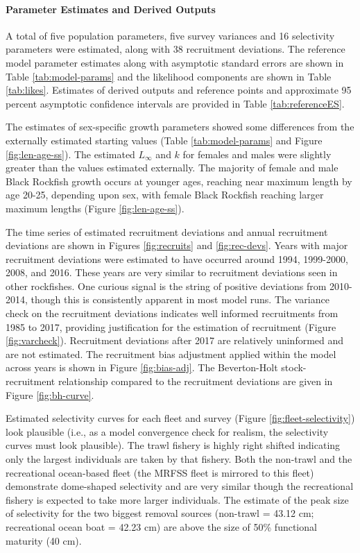 \documentclass[11pt,
  english,
  letterpaper,
]{article}
\begin{document}
\hypertarget{parameter-estimates-and-derived-outputs}{%
\paragraph{Parameter Estimates and Derived Outputs}\label{parameter-estimates-and-derived-outputs}}

A total of five population parameters, five survey variances and 16 selectivity parameters were estimated, along with 38 recruitment deviations. The reference model parameter estimates along with asymptotic standard errors are shown in Table \ref{tab:model-params} and the likelihood components are shown in Table \ref{tab:likes}. Estimates of derived outputs and reference points and approximate 95 percent asymptotic confidence intervals are provided in Table \ref{tab:referenceES}.

The estimates of sex-specific growth parameters showed some differences from the externally estimated starting values (Table \ref{tab:model-params} and Figure \ref{fig:len-age-ss}). The estimated \(L_{\infty}\) and \(k\) for females and males were slightly greater than the values estimated externally. The majority of female and male Black Rockfish growth occurs at younger ages, reaching near maximum length by age 20-25, depending upon sex, with female Black Rockfish reaching larger maximum lengths (Figure \ref{fig:len-age-ss}).

The time series of estimated recruitment deviations and annual recruitment deviations are shown in Figures \ref{fig:recruits} and \ref{fig:rec-devs}. Years with major recruitment deviations were estimated to have occurred around 1994, 1999-2000, 2008, and 2016. These years are very similar to recruitment deviations seen in other rockfishes. One curious signal is the string of positive deviations from 2010-2014, though this is consistently apparent in most model runs. The variance check on the recruitment deviations indicates well informed recruitments from 1985 to 2017, providing justification for the estimation of recruitment (Figure \ref{fig:varcheck}). Recruitment deviations after 2017 are relatively uninformed and are not estimated. The recruitment bias adjustment applied within the model across years is shown in Figure \ref{fig:bias-adj}. The Beverton-Holt stock-recruitment relationship compared to the recruitment deviations are given in Figure \ref{fig:bh-curve}.

Estimated selectivity curves for each fleet and survey (Figure \ref{fig:fleet-selectivity}) look plausible (i.e., as a model convergence check for realism, the selectivity curves must look plausible). The trawl fishery is highly right shifted indicating only the largest individuals are taken by that fishery. Both the non-trawl and the recreational ocean-based fleet (the MRFSS fleet is mirrored to this fleet) demonstrate dome-shaped selectivity and are very similar though the recreational fishery is expected to take more larger individuals. The estimate of the peak size of selectivity for the two biggest removal sources (non-trawl = 43.12 cm; recreational ocean boat = 42.23 cm) are above the size of 50\% functional maturity (40 cm).
\end{document}
